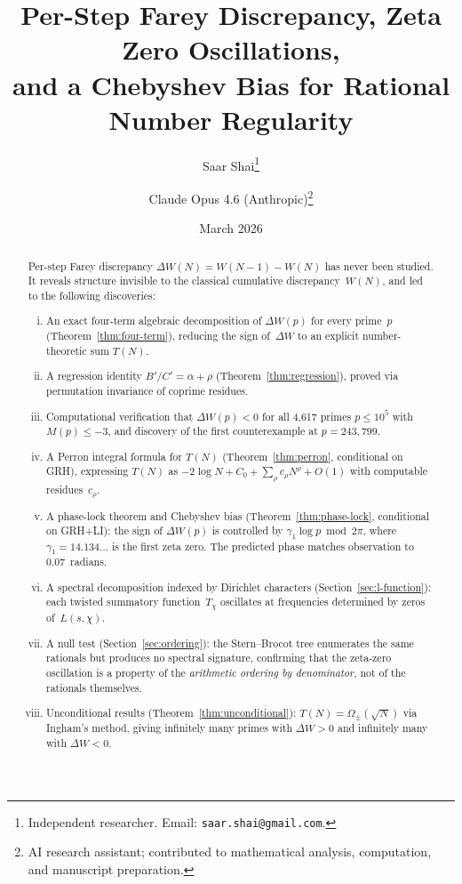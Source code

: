 \documentclass[11pt]{article}
\title{Per-Step Farey Discrepancy, Zeta Zero Oscillations,\\
and a Chebyshev Bias for Rational Number Regularity}
\author{
  Saar Shai\thanks{Independent researcher. Email: \texttt{saar.shai@gmail.com}.}
  \and
  Claude Opus 4.6 (Anthropic)\thanks{AI research assistant; contributed to mathematical analysis, computation, and manuscript preparation.}
}
\date{March 2026}
\theoremstyle{definition}
\begin{document}
\maketitle

\begin{abstract}
Per-step Farey discrepancy $\Delta W(N) = W(N-1) - W(N)$ has never been
studied.  It reveals structure invisible to the classical cumulative
discrepancy~$W(N)$, and led to the following discoveries:
\begin{enumerate}[(i)]
  \item An exact four-term algebraic decomposition of $\Delta W(p)$ for
    every prime~$p$ (Theorem~\ref{thm:four-term}), reducing the sign
    of~$\Delta W$ to an explicit number-theoretic sum $T(N)$.
  \item A regression identity $B'/C' = \alpha + \rho$ (Theorem~\ref{thm:regression}),
    proved via permutation invariance of coprime residues.
  \item Computational verification that $\Delta W(p) < 0$ for all
    4{,}617 primes $p \le 10^5$ with $M(p) \le -3$, and discovery of the
    first counterexample at $p = 243{,}799$.
  \item A Perron integral formula for $T(N)$ (Theorem~\ref{thm:perron},
    conditional on GRH), expressing $T(N)$ as $-2\log N + C_0
    + \sum_\rho c_\rho N^\rho + O(1)$ with computable residues~$c_\rho$.
  \item A phase-lock theorem and Chebyshev bias
    (Theorem~\ref{thm:phase-lock}, conditional on GRH+LI):
    the sign of $\Delta W(p)$ is controlled by
    $\gamma_1 \log p \bmod 2\pi$, where $\gamma_1 = 14.134\ldots$ is the
    first zeta zero.  The predicted phase matches observation to
    $0.07$~radians.
  \item A spectral decomposition indexed by Dirichlet characters
    (Section~\ref{sec:l-function}): each twisted summatory function~$T_\chi$
    oscillates at frequencies determined by zeros of~$L(s,\chi)$.
  \item A null test (Section~\ref{sec:ordering}): the Stern--Brocot tree
    enumerates the same rationals but produces no spectral signature,
    confirming that the zeta-zero oscillation is a property of the
    \emph{arithmetic ordering by denominator}, not of the rationals
    themselves.
  \item Unconditional results (Theorem~\ref{thm:unconditional}):
    $T(N) = \Omega_\pm(\sqrt{N})$ via Ingham's method, giving
    infinitely many primes with $\Delta W > 0$ and infinitely many
    with $\Delta W < 0$.
\end{enumerate}
\end{abstract}
\end{document}

